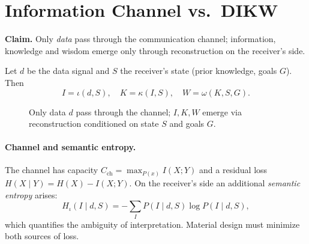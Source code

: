 \documentclass[10pt,a4paper]{article}
\begin{document}
\section{Information Channel vs.\ DIKW}

\textbf{Claim.} Only \emph{data} pass through the communication channel;
information, knowledge and wisdom emerge only through reconstruction on
the receiver's side.

Let $d$ be the data signal and $S$ the receiver's state (prior
knowledge, goals $G$). Then
\begin{equation}
I = \iota(d, S),\quad K = \kappa(I, S),\quad W = \omega(K, S, G).
\end{equation}

\begin{figure}[h]
\centering
{}
\caption{Only data $d$ pass through the channel; $I, K, W$ emerge via
reconstruction conditioned on state $S$ and goals $G$.}
\label{fig:channel}
\end{figure}

\paragraph{Channel and semantic entropy.}
The channel has capacity $C_{\text{ch}} = \max_{P(x)} I(X;Y)$ and a
residual loss $H(X\mid Y) = H(X) - I(X;Y)$. On the receiver's side an
additional \emph{semantic entropy} arises:
\begin{equation}
H_{\iota}(I \mid d, S) = -\sum_{I} P(I\mid d, S)\log P(I\mid d, S),
\end{equation}
which quantifies the ambiguity of interpretation. Material design must
minimize both sources of loss.
\end{document}
